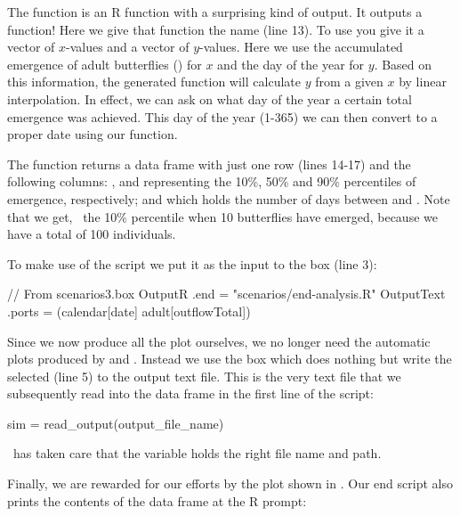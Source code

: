 The  function is an R function with a surprising kind of output. It outputs a function! Here we give that function the name  (line 13). To use  you give it a vector of $x$-values and a vector of $y$-values.  Here we use the accumulated emergence of adult butterflies () for $x$ and the day of the year for $y$. Based on this information, the generated function  will calculate $y$ from a given $x$ by linear interpolation. In effect, we can ask  on what day of the year a certain total emergence was achieved. This day of the year (1-365) we can then convert to a proper date using our  function.

The  function returns a data frame with just one row (lines 14-17) and the following columns: ,  and  representing the 10\%, 50\% and 90\% percentiles of emergence, respectively; and  which holds the number of days between  and . Note that we get, \eg\ the 10\% percentile when 10 butterflies have emerged, because we have a total of 100 individuals.

To make use of the  script we put it as the  input to the  box (line 3):

\lstset{numbers=left}
\begin{boxscript}
// From scenarios3.box
OutputR {
  .end = "scenarios/end-analysis.R"
  OutputText { 
    .ports = (calendar[date] adult[outflowTotal])
  }
}
\end{boxscript}
\lstset{numbers=none}

Since we now produce all the plot ourselves, we no longer need the automatic plots produced by  and . Instead we use the  box which does nothing but write the selected  (line 5) to the output text file. This is the very text file that we subsequently read into the  data frame in the first line of the  script:
\begin{rscript}
sim = read_output(output_file_name)
\end{rscript}
\US\ has taken care that the variable  holds the right file name and path.

Finally, we are rewarded for our efforts by the plot shown in . Our end script also prints the contents of the  data frame at the R prompt:

